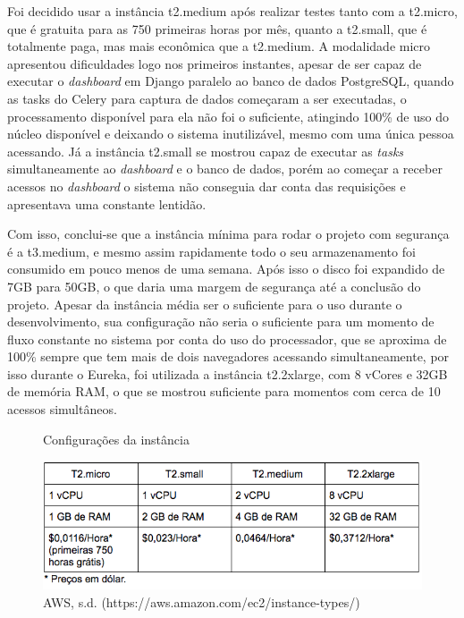 \par Foi decidido usar a instância t2.medium após realizar testes tanto com a t2.micro, que é gratuita para as 750 primeiras horas por mês, quanto a t2.small, que é totalmente paga, mas mais econômica que a t2.medium. A modalidade micro apresentou dificuldades logo nos primeiros instantes, apesar de ser capaz de executar o \textit{dashboard} em Django paralelo ao banco de dados PostgreSQL, quando as tasks do Celery para captura de dados começaram a ser executadas, o processamento disponível para ela não foi o suficiente, atingindo 100\% de uso do núcleo disponível e deixando o sistema inutilizável, mesmo com uma única pessoa acessando. Já a instância t2.small se mostrou capaz de executar as \textit{tasks} simultaneamente ao \textit{dashboard} e o banco de dados, porém ao começar a receber acessos no \textit{dashboard} o sistema não conseguia dar conta das requisições e apresentava uma constante lentidão. 
\indent
\par Com isso, conclui-se que a instância mínima para rodar o projeto com segurança é a t3.medium, e mesmo assim rapidamente todo o seu armazenamento foi consumido em pouco menos de uma semana. Após isso o disco foi expandido de 7GB para 50GB, o que daria uma margem de segurança até a conclusão do projeto. Apesar da instância média ser o suficiente para o uso durante o desenvolvimento, sua configuração não seria o suficiente para um momento de fluxo constante no sistema por conta do uso do processador, que se aproxima de 100\% sempre que tem mais de dois navegadores acessando simultaneamente, por isso durante o Eureka, foi utilizada a instância t2.2xlarge, com 8 vCores e 32GB de memória RAM, o que se mostrou suficiente para momentos com cerca de 10 acessos simultâneos.
\begin{figure}[H]
    \centering
    \caption{Configurações da instância}
    \includegraphics[width=1.0\linewidth]{Imagens/configuracoesDaInstancia.png}
    \caption*{AWS, s.d. (https://aws.amazon.com/ec2/instance-types/)}
    \label{configuracoesDaInstancia}
\end{figure}
